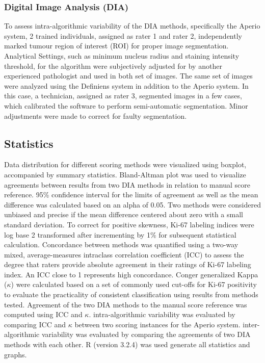 \documentclass[final,5p,times,twocolumn]{elsarticle}
\begin{document}
\subsubsection*{Digital Image Analysis (DIA)}
To assess intra-algorithmic variability of the DIA methods, specifically the Aperio system, 2 trained individuals, assigned as rater 1 and rater 2, independently marked tumour region of interest (ROI) for proper image segmentation. Analytical Settings, such as minimum nucleus radius and staining intensity threshold, for the algorithm were subjectively adjusted for by another experienced pathologist and used in both set of images. The same set of images were analyzed using the Definiens system in addition to the Aperio system. In this case, a technician, assigned as rater 3, segmented images in a few cases, which calibrated the software to perform semi-automatic segmentation. Minor adjustments were made to correct for faulty segmentation.

\subsection*{Statistics}
Data distribution for different scoring methods were visualized using boxplot, accompanied by summary statistics. Bland-Altman plot was used to visualize agreements between results from two DIA methods in relation to manual score reference. \cite{Bland1986} 95\% confidence interval for the limits of agreement as well as the mean difference was calculated based on an alpha of 0.05. Two methods were considered unbiased and precise if the mean difference centered about zero with a small standard deviation. \cite{Hanneman2008} To correct for positive skewness, Ki-67 labeling indices were log base 2 transformed after incrementing by 1\% for subsequent statistical calculation. Concordance between methods was quantified using a two-way mixed, average-measures intraclass correlation coefficient (ICC) to assess the degree that raters provide absolute agreement in their ratings of Ki-67 labeling index. \cite{Shrout1979} An ICC close to 1 represents high concordance. Conger generalized Kappa ($\kappa$) were calculated based on a set of commonly used cut-offs for Ki-67 positivity to evaluate the practicality of consistent classification using results from methods tested. \cite{Conger1980} Agreement of the two DIA methods to the manual score reference was computed using ICC and $\kappa$. intra-algorithmic variability was evaluated by comparing ICC and $\kappa$ between two scoring instances for the Aperio system. inter-algorithmic variability was evaluated by comparing the agreements of two DIA methods with each other. R (version 3.2.4) was used generate all statistics and graphs.
\end{document}
